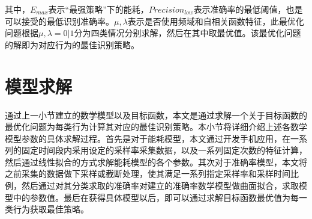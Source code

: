 其中，$E_{max}$表示“最强策略”下的能耗，$Precision_{low}$表示准确率的最低阈值，也是可以接受的最低识别准确率。$\mu, \lambda$表示是否使用频域和自相关函数特征，此最优化问题根据$\mu, \lambda = 0|1$分为四类情况分别求解，然后在其中取最优值。该最优化问题的解即为对应行为的最佳识别策略。


\section{模型求解}
\par 通过上一小节建立的数学模型以及目标函数，本文是通过求解一个关于目标函数的最优化问题为每类行为计算其对应的最佳识别策略。本小节将详细介绍上述各数学模型参数的具体求解过程。首先是对于能耗模型，本文通过开发手机应用，在一系列的固定时间段内采用设定的采样率采集数据，以及一系列固定次数的特征计算，然后通过线性拟合的方式求解能耗模型的各个参数。其次对于准确率模型，本文将之前采集的数据做下采样或截断处理，使其满足一系列指定采样率和采样时间比例，然后通过对其分类求取的准确率对建立的准确率数学模型做曲面拟合，求取模型中的参数值。最后在获得具体模型以后，即可以通过求解目标函数最优值为每一类行为获取最佳策略。

